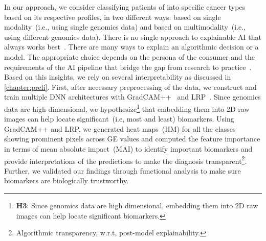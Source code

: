 \hspace*{3.5mm} In our approach, we consider classifying patients of into specific cancer types based on its respective profiles, in two different ways: based on single modality~(i.e., using single genomics data) and based on multimodality~(i.e., using different genomics data). There is no single approach to explainable AI that always works best~\cite{arya2019one}. There are many ways to explain an algorithmic decision or a model. The appropriate choice depends on the persona of the consumer and the requirements of the AI pipeline that bridge the gap from research to practice~\cite{arya2019one}. Based on this insights, we rely on several interpretability as discussed in \cref{chapter:preli}. First, after necessary preprocessing of the data, we construct and train multiple DNN architectures with GradCAM++~\cite{chattopadhay2018grad} and LRP~\cite{LRP1}. Since genomics data are high dimensional, we hypothesize\footnote{\textbf{H3}: Since genomics data are high dimensional, embedding them into 2D raw images can help locate significant biomarkers.} that embedding them into 2D raw images can help locate significant~(i.e, most and least) biomarkers. 
Using GradCAM++ and LRP, we generated heat maps~(HM) for all the classes showing prominent pixels across GE values and computed the feature importance in terms of mean absolute impact~(MAI) to identify important biomarkers and provide interpretations of the predictions to make the diagnosis transparent\footnote{Algorithmic transparency, w.r.t, post-model explainability.}. Further, we validated our findings through functional analysis to make sure biomarkers are biologically trustworthy. %

